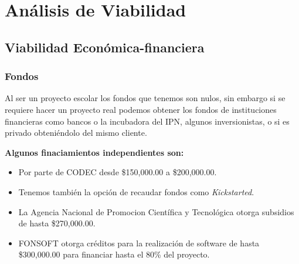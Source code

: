 \documentclass[12pt, fleqn]{report}                             %
\theoremstyle{break}                                            %
\begin{document}
\restoregeometry                                                    %
\nopagecolor                                                        %




\tableofcontents{}
\label{sec:Index}

\clearpage



\chapter{Análisis de Viabilidad}

\clearpage
\section{Viabilidad Económica-financiera}
    \subsection{Fondos}
    Al ser un proyecto escolar los fondos que tenemos son nulos, sin embargo si se requiere hacer un proyecto real podemos obtener los fondos de instituciones financieras como bancos o la incubadora del IPN, algunos inversionistas, o si es privado obteniéndolo del mismo cliente.
    
    
    \textbf{Algunos finaciamientos independientes son:}
    \begin{itemize}
        \item Por parte de CODEC desde \$150,000.00 a \$200,000.00.
        \item Tenemos también la opción de recaudar fondos como \emph{Kickstarted}.
        \item La Agencia Nacional de Promocion Científica y Tecnológica otorga subsidios de hasta \$270,000.00.
        \item FONSOFT otorga créditos para la realización de software de hasta \$300,000.00 para financiar hasta el 80\% del proyecto.
    \end{itemize}
\end{document}
